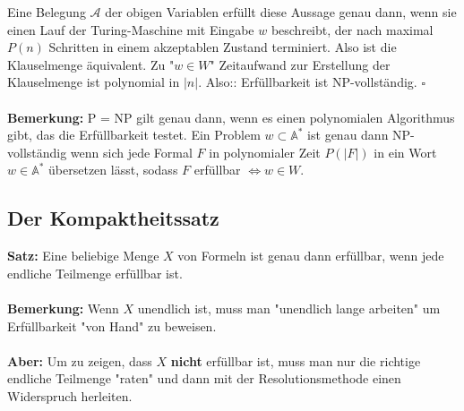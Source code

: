 \documentclass[a4paper]{scrartcl}
\begin{document}
Eine Belegung $\mathcal{A}$ der obigen Variablen erfüllt diese Aussage genau dann, wenn sie einen Lauf der Turing-Maschine mit Eingabe $w$ beschreibt, der nach maximal $P(n)$ Schritten in einem akzeptablen Zustand terminiert. Also ist die Klauselmenge äquivalent. Zu "$w \in W$" Zeitaufwand zur Erstellung der Klauselmenge ist polynomial in $|n|$. Also:: Erfüllbarkeit ist NP-vollständig. $\square$
\bigskip\\\\
\textbf{Bemerkung:} P = NP gilt genau dann, wenn es einen polynomialen Algorithmus gibt, das die Erfüllbarkeit testet. Ein Problem $w \subset \mathbb{A}^*$ ist genau dann NP-vollständig wenn sich jede Formal $F$ in polynomialer Zeit $P(|F|)$ in ein Wort $w \in \mathbb{A}^*$ übersetzen lässt, sodass $F$ erfüllbar $\Leftrightarrow w \in W$.
\newpage
\subsection{Der Kompaktheitssatz}
\textbf{Satz:} Eine beliebige Menge $X$ von Formeln ist genau dann erfüllbar, wenn jede endliche Teilmenge erfüllbar ist.
\bigskip\\\\
\textbf{Bemerkung:} Wenn $X$ unendlich ist, muss man "unendlich lange arbeiten" um Erfüllbarkeit "von Hand" zu beweisen.
\bigskip\\\\
\textbf{Aber:} Um zu zeigen, dass $X$ \textbf{nicht} erfüllbar ist, muss man nur die richtige endliche Teilmenge "raten" und dann mit der Resolutionsmethode einen Widerspruch herleiten.
\end{document}
